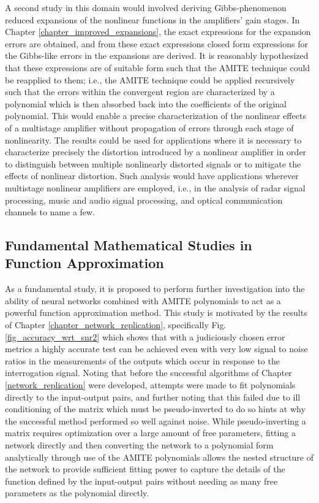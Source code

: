 A second study in this domain would involved deriving Gibbs-phenomenon reduced expansions of the nonlinear functions in the amplifiers' gain stages.  In Chapter \ref{chapter_improved_expansions}, the exact expressions for the expansion errors are obtained, and from these exact expressions closed form expressions for the Gibbs-like errors in the expansions are derived.  It is reasonably hypothesized that these expressions are of suitable form such that the AMITE technique could be reapplied to them; i.e., the AMITE technique could be applied recursively such that the errors within the convergent region are characterized by a polynomial which is then absorbed back into the coefficients of the original polynomial.  This would enable a precise characterization of the nonlinear effects of a multistage amplifier without propagation of errors through each stage of nonlinearity.  The results could be used for applications where it is necessary to characterize precisely the distortion introduced by a nonlinear amplifier in order to distinguish between multiple nonlinearly distorted signals or to mitigate the effects of nonlinear distortion.  Such analysis would have applications wherever multistage nonlinear amplifiers are employed, i.e., in the analysis of radar signal processing, music and audio signal processing, and optical communication channels to name a few.

\subsection{Fundamental Mathematical Studies in Function Approximation}

As a fundamental study, it is proposed to perform further investigation into the ability of neural networks combined with AMITE polynomials to act as a powerful function approximation method.  This study is motivated by the results of Chapter \ref{chapter_network_replication}, specifically Fig. \ref{fig_accuracy_wrt_snr2} which shows that with a judiciously chosen error metrics a highly accurate test can be achieved even with very low signal to noise ratios in the measurements of the outputs which occur in response to the interrogation signal.  Noting that before the successful algorithms of Chapter \ref{network_replication} were developed, attempts were made to fit polynomials directly to the input-output pairs, and further noting that this failed due to ill conditioning of the matrix which must be pseudo-inverted to do so hints at why the successful method performed so well against noise.  While pseudo-inverting a matrix requires optimization over a large amount of free parameters, fitting a network directly and then converting the network to a polynomial form analytically through use of the AMITE polynomials allows the nested structure of the network to provide sufficient fitting power to capture the details of the function defined by the input-output pairs without needing as many free parameters as the polynomial directly.

